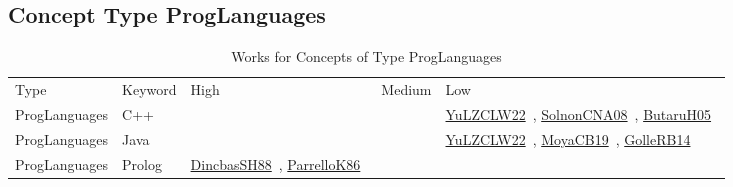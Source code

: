 \clearpage
\subsection{Concept Type ProgLanguages}
\label{sec:ProgLanguages}
{\scriptsize
\begin{longtable}{lp{3cm}>{\raggedright\arraybackslash}p{6cm}>{\raggedright\arraybackslash}p{6cm}>{\raggedright\arraybackslash}p{8cm}}
\rowcolor{white}\caption{Works for Concepts of Type ProgLanguages}\\ \toprule
\rowcolor{white}Type & Keyword & High & Medium & Low\\ \midrule\endhead
\bottomrule
\endfoot
ProgLanguages & C++ &  &  & \href{../cars/works/YuLZCLW22.pdf}{YuLZCLW22}~\cite{YuLZCLW22}, \href{../cars/works/SolnonCNA08.pdf}{SolnonCNA08}~\cite{SolnonCNA08}, \href{../cars/works/ButaruH05.pdf}{ButaruH05}~\cite{ButaruH05}\\
ProgLanguages & Java &  &  & \href{../cars/works/YuLZCLW22.pdf}{YuLZCLW22}~\cite{YuLZCLW22}, \href{../cars/works/MoyaCB19.pdf}{MoyaCB19}~\cite{MoyaCB19}, \href{../cars/works/GolleRB14.pdf}{GolleRB14}~\cite{GolleRB14}\\
ProgLanguages & Prolog & \href{../cars/works/DincbasSH88.pdf}{DincbasSH88}~\cite{DincbasSH88}, \href{../cars/works/ParrelloK86.pdf}{ParrelloK86}~\cite{ParrelloK86} &  & \\
\end{longtable}
}

